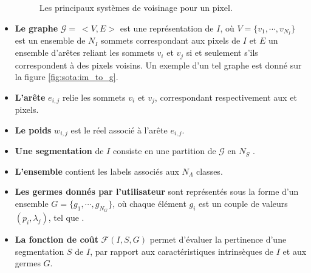 \begin{itemize}
\begin{figure}[htb]
\begin{subfigure}[t]{0.2\textwidth}
	\end{subfigure}
	\caption{Les principaux systèmes de voisinage pour un pixel.}
	\label{fig:sota:vois}
\end{figure}

\item \textbf{Le graphe} $\mathcal{G}=\ <V,E>$ est une représentation de $I$, où $V=\lbrace v_{1},\cdots, v_{N_{I}} \rbrace$ est un ensemble de $N_{I}$ sommets correspondant aux pixels de $I$ et $E$ un ensemble d'arêtes reliant les sommets $v_{i}$ et $v_{j}$ si et seulement s'ils correspondent à des pixels voisins. Un exemple d'un tel graphe est donné sur la figure \ref{fig:sota:im_to_g}.

\item \textbf{L'arête} $e_{i,j}$ relie les sommets $v_{i}$ et $v_{j}$, correspondant respectivement aux     et    pixels. 
\item \textbf{Le poids }$w_{i,j}$ est le réel associé à l'arête $e_{i,j}$.
\item \textbf{Une segmentation }  de $I$ consiste en  une partition de $\mathcal{G}$ en $N_{S}$ .
\item \textbf{L'ensemble}  contient les labels associés aux $N_{\Lambda}$ classes.
\item \textbf{Les germes donnés par l'utilisateur} sont représentés sous la forme d'un ensemble $G= \lbrace g_{1}, \cdots, g_{N_{G}} \rbrace$, où chaque élément $g_{i}$ est un couple de valeurs $(p_{i},\lambda_{j})$, tel que   .
\item \textbf{La fonction de coût} $ \mathcal{F}(I,S,G)$ permet d'évaluer la pertinence d'une segmentation $S$ de $I$, par rapport aux caractéristiques intrinsèques de $I$ et aux germes $G$.  
\end{itemize}



